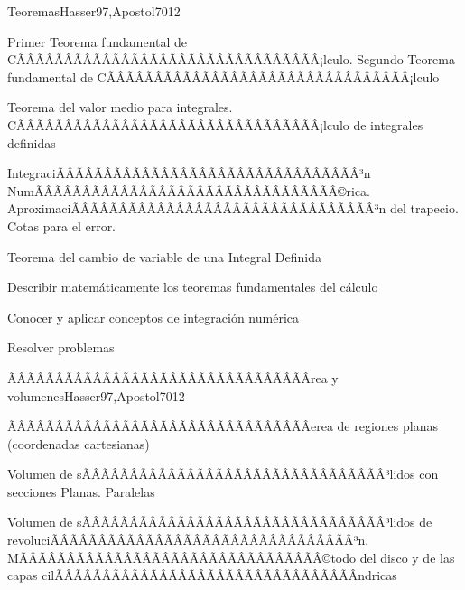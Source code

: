 \begin{sumilla}
\begin{unit}{Teoremas}{Hasser97,Apostol70}{12}
\begin{topicos}
      \item Primer Teorema fundamental de CÃÂÃÂÃÂÃÂÃÂÃÂÃÂÃÂÃÂÃÂÃÂÃÂÃÂÃÂÃÂÃÂ¡lculo. Segundo Teorema fundamental de CÃÂÃÂÃÂÃÂÃÂÃÂÃÂÃÂÃÂÃÂÃÂÃÂÃÂÃÂÃÂÃÂ¡lculo
      \item Teorema del valor medio para integrales. CÃÂÃÂÃÂÃÂÃÂÃÂÃÂÃÂÃÂÃÂÃÂÃÂÃÂÃÂÃÂÃÂ¡lculo de integrales definidas
      \item IntegraciÃÂÃÂÃÂÃÂÃÂÃÂÃÂÃÂÃÂÃÂÃÂÃÂÃÂÃÂÃÂÃÂ³n NumÃÂÃÂÃÂÃÂÃÂÃÂÃÂÃÂÃÂÃÂÃÂÃÂÃÂÃÂÃÂÃÂ©rica. AproximaciÃÂÃÂÃÂÃÂÃÂÃÂÃÂÃÂÃÂÃÂÃÂÃÂÃÂÃÂÃÂÃÂ³n del trapecio. Cotas para el error.
      \item Teorema del cambio de variable de una Integral Definida
\end{topicos}

   \begin{objetivos}
      \item Describir matem\'aticamente los teoremas fundamentales del c\'alculo
      \item Conocer y aplicar conceptos de integraci\'on num\'erica
	\item Resolver problemas
   \end{objetivos}
\end{unit}

\begin{unit}{ÃÂÃÂÃÂÃÂÃÂÃÂÃÂÃÂÃÂÃÂÃÂÃÂÃÂÃÂÃÂÃÂrea y volumenes}{Hasser97,Apostol70}{12}
\begin{topicos}
      \item ÃÂÃÂÃÂÃÂÃÂÃÂÃÂÃÂÃÂÃÂÃÂÃÂÃÂÃÂÃÂÃÂerea de regiones planas (coordenadas cartesianas)
      \item Volumen de sÃÂÃÂÃÂÃÂÃÂÃÂÃÂÃÂÃÂÃÂÃÂÃÂÃÂÃÂÃÂÃÂ³lidos con secciones Planas. Paralelas
      \item Volumen de sÃÂÃÂÃÂÃÂÃÂÃÂÃÂÃÂÃÂÃÂÃÂÃÂÃÂÃÂÃÂÃÂ³lidos de revoluciÃÂÃÂÃÂÃÂÃÂÃÂÃÂÃÂÃÂÃÂÃÂÃÂÃÂÃÂÃÂÃÂ³n. MÃÂÃÂÃÂÃÂÃÂÃÂÃÂÃÂÃÂÃÂÃÂÃÂÃÂÃÂÃÂÃÂ©todo del disco y de las capas cilÃÂÃÂÃÂÃÂÃÂÃÂÃÂÃÂÃÂÃÂÃÂÃÂÃÂÃÂÃÂÃÂ­ndricas
\end{topicos}


\end{unit}
\end{sumilla}
